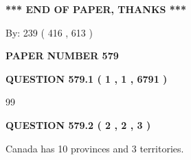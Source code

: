 \documentclass[12pt]{article}
\begin{document}
 
 
 
   
   
 \vspace{0.2in}
 
   
   
   
   
\vspace{1.0in} 
{\textbf{\large{ *** END OF PAPER, THANKS *** }}} 
   
   
\hspace{1.0in} By: 
 239 ( 416 ,  613 )
   
   
   
   
\newpage 
\setcounter{page}{ 
   579001 } 
   
   
   
   
 {\textbf{ \Large{ PAPER NUMBER  579  }}}
   
   
\vspace{0.2in}
   
   
   
   
   
   
 \vspace{0.2in}
 
 
 
 
   
   
  
\vspace{0.2in}
  
{\textbf{\Large{QUESTION
579.1 
 ( 1 , 1 , 6791 )
}}}
  
  
 
 
\noindent{}

99
 
 
  
\vspace{0.2in}
  
{\textbf{\Large{QUESTION
579.2 
 ( 2 , 2 , 3 )
}}}
  
  
 
 
\noindent{}
 
 
Canada has 10  provinces and 3 territories.
 
 
 
 
   
   
 \vspace{0.2in}
 
   
   
\end{document}
